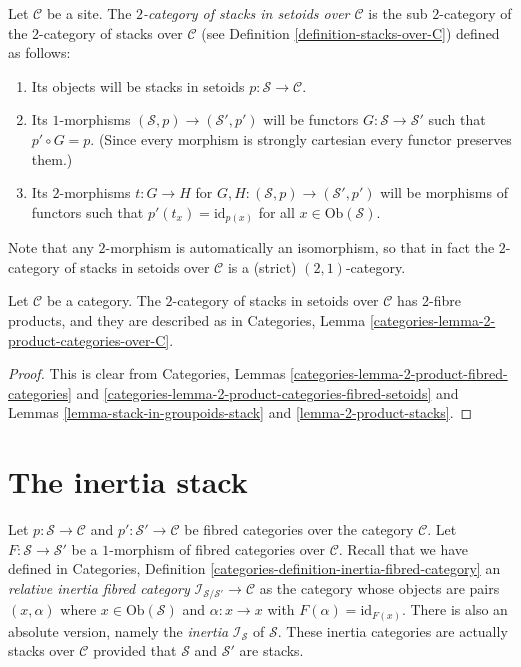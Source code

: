 \begin{definition}
\label{definition-stacks-in-setoids-over-C}
Let $\mathcal{C}$ be a site.
The {\it $2$-category of stacks in setoids over $\mathcal{C}$}
is the sub $2$-category of the $2$-category of stacks
over $\mathcal{C}$ (see Definition \ref{definition-stacks-over-C})
defined as follows:
\begin{enumerate}
\item Its objects will be stacks in setoids
$p : \mathcal{S} \to \mathcal{C}$.
\item Its $1$-morphisms $(\mathcal{S}, p) \to (\mathcal{S}', p')$
will be functors $G : \mathcal{S} \to \mathcal{S}'$ such that
$p' \circ G = p$. (Since every morphism is strongly cartesian
every functor preserves them.)
\item Its $2$-morphisms $t : G \to H$ for
$G, H : (\mathcal{S}, p) \to (\mathcal{S}', p')$
will be morphisms of functors
such that $p'(t_x) = \text{id}_{p(x)}$
for all $x \in \text{Ob}(\mathcal{S})$.
\end{enumerate}
\end{definition}

\noindent
Note that any $2$-morphism is automatically an isomorphism, so
that in fact the $2$-category of stacks in setoids over $\mathcal{C}$
is a (strict) $(2,1)$-category.

\begin{lemma}
\label{lemma-2-product-stacks-in-setoids}
Let $\mathcal{C}$ be a category.
The $2$-category of stacks in setoids over $\mathcal{C}$
has 2-fibre products, and they are described as in
Categories, Lemma \ref{categories-lemma-2-product-categories-over-C}.
\end{lemma}

\begin{proof}
This is clear from
Categories, Lemmas \ref{categories-lemma-2-product-fibred-categories} and
\ref{categories-lemma-2-product-categories-fibred-setoids}
and
Lemmas \ref{lemma-stack-in-groupoids-stack} and
\ref{lemma-2-product-stacks}.
\end{proof}






\section{The inertia stack}
\label{section-the-inertia-stack}

\noindent
Let
$p : \mathcal{S} \to \mathcal{C}$ and
$p' : \mathcal{S}' \to \mathcal{C}$
be fibred categories over the category $\mathcal{C}$.
Let $F : \mathcal{S} \to \mathcal{S}'$ be a $1$-morphism of
fibred categories over $\mathcal{C}$.
Recall that we have defined in
Categories, Definition \ref{categories-definition-inertia-fibred-category}
an {\it relative inertia fibred category}
$\mathcal{I}_{\mathcal{S}/\mathcal{S}'} \to \mathcal{C}$ as the
category whose objects are pairs $(x ,\alpha)$ where
$x \in \text{Ob}(\mathcal{S})$ and $\alpha : x \to x$ with
$F(\alpha) = \text{id}_{F(x)}$. There is also an absolute version,
namely the {\it inertia} $\mathcal{I}_{\mathcal{S}}$ of $\mathcal{S}$.
These inertia categories are actually stacks over $\mathcal{C}$ provided
that $\mathcal{S}$ and $\mathcal{S}'$ are stacks.

